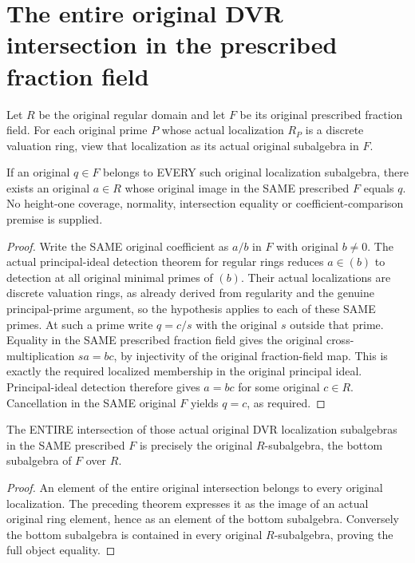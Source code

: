 \section{The entire original DVR intersection in the prescribed fraction field}
\label{sec:regular-dvr-intersection}

Let $R$ be the original regular domain and let $F$ be its original
prescribed fraction field. For each original prime $P$ whose actual
localization $R_P$ is a discrete valuation ring, view that localization
as its actual original subalgebra in $F$.

\begin{theorem}
\label{sc0-regular-dvr-intersection:original-ring}
\leanok
If an original $q\in F$ belongs to EVERY such original localization
subalgebra, there exists an original $a\in R$ whose original image
in the SAME prescribed $F$ equals $q$. No height-one coverage,
normality, intersection equality or coefficient-comparison premise
is supplied.
\end{theorem}
\begin{proof}
Write the SAME original coefficient as $a/b$ in $F$ with original
$b\ne0$. The actual principal-ideal detection theorem for regular
rings reduces $a\in(b)$ to detection at all original minimal primes
of $(b)$. Their actual localizations are discrete valuation rings,
as already derived from regularity and the genuine principal-prime
argument, so the hypothesis applies to each of these SAME primes.
At such a prime write $q=c/s$ with the original $s$ outside that
prime. Equality in the SAME prescribed fraction field gives the
original cross-multiplication $sa=bc$, by injectivity of the
original fraction-field map. This is exactly the required localized
membership in the original principal ideal. Principal-ideal
detection therefore gives $a=bc$ for some original $c\in R$.
Cancellation in the SAME original $F$ yields $q=c$, as required.
\end{proof}

\begin{theorem}
\label{sc0-regular-dvr-intersection:whole-subalgebra}
\leanok
The ENTIRE intersection of those actual original DVR localization
subalgebras in the SAME prescribed $F$ is precisely the original
$R$-subalgebra, the bottom subalgebra of $F$ over $R$.
\end{theorem}
\begin{proof}
An element of the entire original intersection belongs to every
original localization. The preceding theorem expresses it as the
image of an actual original ring element, hence as an element of
the bottom subalgebra. Conversely the bottom subalgebra is contained
in every original $R$-subalgebra, proving the full object equality.
\end{proof}

